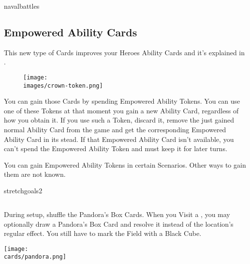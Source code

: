 \begin{multicols*}{2}
\vspace*{1em}
\begin{expansion}{navalbattles}
  \subsection*{Empowered Ability Cards}
  This new type of Cards improves your Heroes Ability Cards and it's explained in .

  \setlength\intextsep{0pt}
  \setlength\columnsep{1em}
  \begin{wrapfigure}{r}{0.2\linewidth}
    \texttt{[image: \\images/crown-token.png]}
  \end{wrapfigure}
  You can gain those Cards by spending Empowered Ability Tokens.
  You can use one of these Tokens at that moment you gain a new Ability Card, regardless of how you obtain it.
  If you use such a Token, discard it, remove the just gained normal Ability Card from the game and get the corresponding Empowered Ability Card in its stead.
  If that Empowered Ability Card isn't available, you can't spend the Empowered Ability Token and must keep it for later turns.

  You can gain Empowered Ability Tokens in certain Scenarios.
  Other ways to gain them are not known.
\end{expansion}

\begin{expansion}{stretchgoals2}
  \subsection*{}
  During setup, shuffle the Pandora's Box Cards.
  When you Visit a , you may optionally draw a Pandora's Box Card and resolve it instead of the location's regular effect.
  You still have to mark the Field with a Black Cube.

  \medskip
  \begin{center}
    \texttt{[image: \\cards/pandora.png]}
  \end{center}
\end{expansion}

\vspace*{1em}

\end{multicols*}
